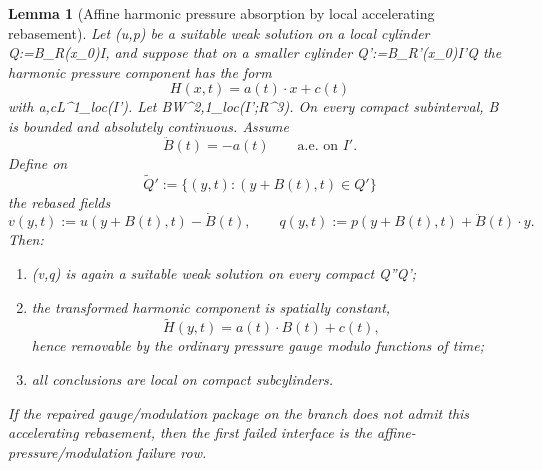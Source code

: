 \documentclass[11pt]{amsart}
\def\({}%
\def\){}%
\def\mathbb#1{#1}%
\theoremstyle{plain}
\newtheorem{lemma}[lemma]{Lemma}
\theoremstyle{definition}
\theoremstyle{remark}
\newcommand{\RR}{\mathbb R}
\begin{document}
\begin{lemma}[Affine harmonic pressure absorption by local accelerating rebasement]
\label{paper8:lem:affine-harmonic-pressure-absorption}
Let \((u,p)\) be a suitable weak solution on a local cylinder
\(Q:=B_R(x_0)\times I\), and suppose that on a smaller cylinder
\(Q':=B_{R'}(x_0)\times I'\Subset Q\) the harmonic pressure component has the
form
\[
H(x,t)=a(t)\cdot x+c(t)
\]
with \(a,c\in L^1_{\rm loc}(I')\).  Let \(B\in W^{2,1}_{\rm loc}(I';\RR^3)\).
On every compact subinterval, \(\dot B\) is bounded and absolutely continuous.
Assume
\[
\ddot B(t)=-a(t)
\qquad\text{a.e. on }I'.
\]
Define on
\[
\widetilde Q':=\{(y,t):(y+B(t),t)\in Q'\}
\]
the rebased fields
\[
v(y,t):=u(y+B(t),t)-\dot B(t),
\qquad
q(y,t):=p(y+B(t),t)+\ddot B(t)\cdot y.
\]
Then:
\begin{enumerate}[label=\textup{(\roman*)}]
\item \((v,q)\) is again a suitable weak solution on every compact
\(\widetilde Q''\Subset\widetilde Q'\);
\item the transformed harmonic component is spatially constant,
\[
\widetilde H(y,t)=a(t)\cdot B(t)+c(t),
\]
hence removable by the ordinary pressure gauge modulo functions of time;
\item all conclusions are local on compact subcylinders.
\end{enumerate}
If the repaired gauge/modulation package on the branch does not admit this
accelerating rebasement, then the first failed interface is the
affine-pressure/modulation failure row.
\end{lemma}
\end{document}
